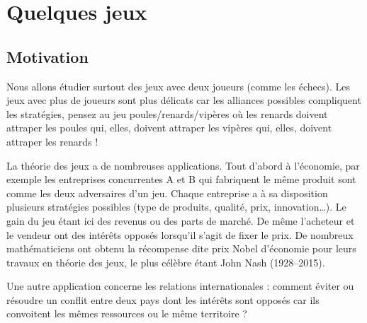 \documentclass[11pt,class=report,crop=false]{standalone}
\begin{document}

%
%
%




\section{Quelques jeux}

\subsection{Motivation}

Nous allons étudier surtout des jeux avec deux joueurs (comme les échecs).
Les jeux avec plus de joueurs sont plus délicats car les alliances possibles compliquent les stratégies, pensez au jeu \og{}poules/renards/vipères\fg{} où les renards doivent attraper les poules qui, elles, doivent attraper les vipères qui, elles, doivent attraper les renards !

La théorie des jeux a de nombreuses applications. Tout d'abord à l'économie, par exemple les entreprises concurrentes A et B qui fabriquent le même produit sont comme les deux adversaires d'un jeu. Chaque entreprise a à sa disposition plusieurs stratégies possibles (type de produits, qualité, prix, innovation\ldots). Le gain du jeu étant ici des revenus ou des parts de marché.
De même l'acheteur et le vendeur ont des intérêts opposés lorsqu'il s'agit de fixer le prix.
De nombreux mathématiciens ont obtenu la récompense dite \og{}prix Nobel d'économie\fg{} pour leurs travaux en théorie des jeux, le plus célèbre étant John Nash (1928--2015).

Une autre application concerne les relations internationales : comment éviter ou résoudre un conflit entre deux pays dont les intérêts sont opposés car ils convoitent les mêmes ressources ou le même territoire ?

\medskip
\end{document}
